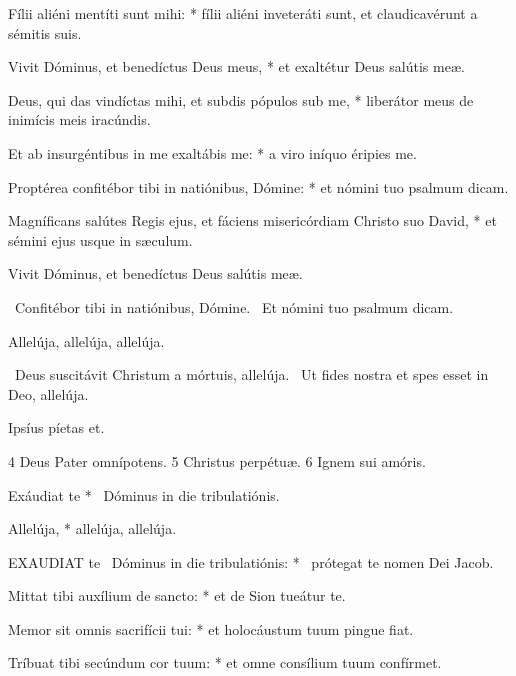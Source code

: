 Fílii aliéni mentíti sunt mihi: * fílii aliéni inveteráti sunt, et claudicavérunt a sémitis suis.

Vivit Dóminus, et benedíctus Deus meus, * et exaltétur Deus salútis meæ.

Deus, qui das vindíctas mihi, et subdis pópulos sub me, * liberátor meus de inimícis meis iracúndis.

Et ab insurgéntibus in me exaltábis me: * a viro iníquo éripies me.

Proptérea confitébor tibi in natiónibus, Dómine: * et nómini tuo psalmum dicam.

Magníficans salútes Regis ejus, et fáciens misericórdiam Christo suo David, * et sémini ejus usque in sæculum.

 Vivit Dóminus, et benedíctus Deus salútis meæ.


\V\ Confitébor tibi in natiónibus, Dómine. \R\ Et nómini tuo psalmum dicam.


 Allelúja, allelúja, allelúja.

\V\ Deus suscitávit Christum a mórtuis, allelúja. \R\ Ut fides nostra et spes esset in Deo, allelúja.

 Ipsíus píetas et.

 4 Deus Pater omnípotens. 5 Christus perpétuæ. 6 Ignem sui amóris.



 Exáudiat te * \textdagger\ Dóminus in die tribulatiónis. \textdagger


 Allelúja, * allelúja, allelúja.


\lettrine[lines=2]{E}{XAUDIAT} te \textdagger\ Dóminus in die tribulatiónis: * \textdagger\ prótegat te nomen Dei Jacob.

Mittat tibi auxílium de sancto: * et de Sion tueátur te.

Memor sit omnis sacrifícii tui: * et holocáustum tuum pingue fiat.

Tríbuat tibi secúndum cor tuum: * et omne consílium tuum confírmet.


